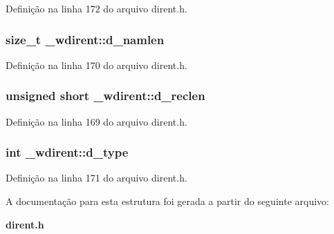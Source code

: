 Definição na linha 172 do arquivo dirent.\+h.

\subsubsection[{d\+\_\+namlen}]{\setlength{\rightskip}{0pt plus 5cm}size\+\_\+t \+\_\+wdirent\+::d\+\_\+namlen}\label{struct__wdirent_a0050d6131e6fa90206903e216b38799e}


Definição na linha 170 do arquivo dirent.\+h.

\subsubsection[{d\+\_\+reclen}]{\setlength{\rightskip}{0pt plus 5cm}unsigned short \+\_\+wdirent\+::d\+\_\+reclen}\label{struct__wdirent_aff7f360608e576cd18cf11f2caf13ef3}


Definição na linha 169 do arquivo dirent.\+h.

\subsubsection[{d\+\_\+type}]{\setlength{\rightskip}{0pt plus 5cm}int \+\_\+wdirent\+::d\+\_\+type}\label{struct__wdirent_a3c3874604ffccbeeaffd96709763cc3b}


Definição na linha 171 do arquivo dirent.\+h.



A documentação para esta estrutura foi gerada a partir do seguinte arquivo\+:\begin{DoxyCompactItemize}
\item 
{\bf dirent.\+h}\end{DoxyCompactItemize}
